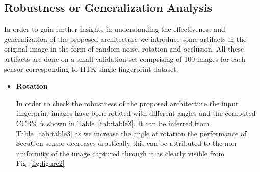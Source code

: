 \documentclass[12pt, a4paper,twoside]{article}
\begin{document}
\subsection{Robustness or Generalization Analysis}
\label{sec:robustGeneralization}
	In order to gain further insights in understanding the effectiveness and generalization of the proposed architecture we introduce some artifacts in the original image in the form of random-noise, rotation and occlusion. All these artifacts are done on a small validation-set comprising of 100 images for each sensor corresponding to IITK single fingerprint dataset.

	\begin{itemize}
		\item \textbf{Rotation}

	In order to check the robustness of the proposed architecture the input fingerprint images have been rotated with different angles and the computed CCR\% is shown in Table~\ref{tab:table3}. It can be inferred from Table~\ref{tab:table3} as we increase the angle of rotation the performance of SecuGen sensor decreases drastically this can be attributed to the non uniformity of the image captured through it as clearly visible from Fig~\ref{fig:figure2}


\end{itemize}
\end{document}
